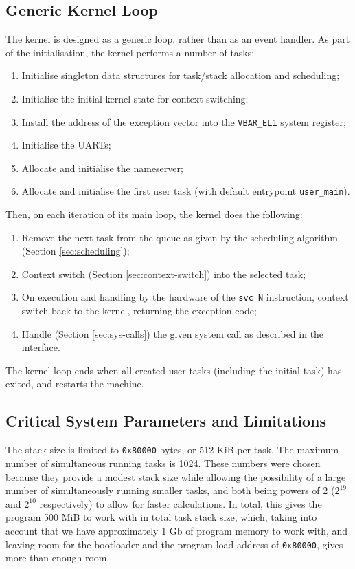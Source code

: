 \documentclass[12pt, titlepage]{article}
\begin{document}
    \subsection{Generic Kernel Loop}
    \label{sec:main}

    The kernel is designed as a generic loop, rather than as an event handler. As part of the initialisation, the kernel performs a number of tasks:
    \begin{enumerate}[(1)]
        \item Initialise singleton data structures for task/stack allocation and scheduling;
        \item Initialise the initial kernel state for context switching;
        \item Install the address of the exception vector into the \verb`VBAR_EL1` system register;
        \item Initialise the UARTs;
        \item Allocate and initialise the nameserver;
        \item Allocate and initialise the first user task (with default entrypoint \verb`user_main`).
    \end{enumerate}

    Then, on each iteration of its main loop, the kernel does the following:
    \begin{enumerate}[(1)]
        \item Remove the next task from the queue as given by the scheduling algorithm (Section \ref{sec:scheduling});
        \item Context switch (Section \ref{sec:context-switch}) into the selected task;
        \item On execution and handling by the hardware of the \verb`svc N` instruction, context switch back to the kernel, returning the exception code;
        \item Handle (Section \ref{sec:sys-calls}) the given system call as described in the interface.
    \end{enumerate}

    The kernel loop ends when all created user tasks (including the initial task) has exited, and restarts the machine.

    \subsection{Critical System Parameters and Limitations}
    \label{sec:limits}
    The stack size is limited to \verb`0x80000` bytes, or 512 KiB per task. The maximum number of simultaneous running tasks is 1024. These numbers were chosen because they provide a modest stack size while allowing the possibility of a large number of simultaneously running smaller tasks, and both being powers of 2 ($2^{19}$ and $2^{10}$ respectively) to allow for faster calculations. In total, this gives the program 500 MiB to work with in total task stack size, which, taking into account that we have approximately 1 Gb of program memory to work with, and leaving room for the bootloader and the program load address of \verb`0x80000`, gives more than enough room.
\end{document}

